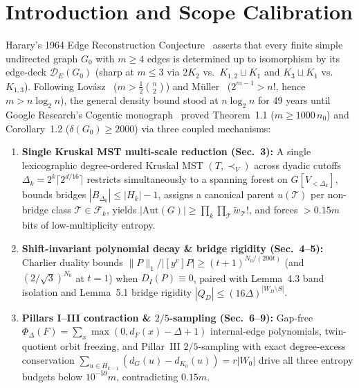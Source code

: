 \documentclass[10pt,twocolumn]{article}
\begin{document}
\section{Introduction and Scope Calibration}\label{sec:intro}
Harary's 1964 Edge Reconstruction Conjecture~\cite{harary1964problem} asserts that every finite simple undirected graph $G_0$ with $m \ge 4$ edges is determined up to isomorphism by its edge-deck $\mathcal{D}_E(G_0)$ (sharp at $m\le 3$ via $2K_2$ vs.\ $K_{1,2}\sqcup K_1$ and $K_3\sqcup K_1$ vs.\ $K_{1,3}$). Following Lov\'asz~\cite{lovasz1972note} ($m > \frac{1}{2}\binom{n}{2}$) and M\"uller~\cite{muller1977probabilistic} ($2^{m-1} > n!$, hence $m > n\log_2 n$), the general density bound stood at $n\log_2 n$ for 49 years until Google Research's Cogentic monograph~\cite{cogentic2026edgerecon} proved Theorem~1.1 ($m \ge 1000\,n_0$) and Corollary~1.2 ($\delta(G_0)\ge 2000$) via three coupled mechanisms:
\begin{enumerate}[leftmargin=1.2em,itemsep=1pt,topsep=2pt]
  \item \textbf{Single Kruskal MST multi-scale reduction (Sec.~3):} A single lexicographic degree-ordered Kruskal MST $(T,\prec_V)$ across dyadic cutoffs $\Delta_k = 2^k\lceil 2^{\bar{d}/16}\rceil$ restricts simultaneously to a spanning forest on $G[V_{<\Delta_k}]$, bounds bridges $|B_{\Delta_k}|\le |H_k|-1$, assigns a canonical parent $u(\mathcal{T})$ per non-bridge class $\mathcal{T}\in\mathcal{F}_k$, yields $|\mathrm{Aut}(G)|\ge \prod_k\prod_{\mathcal{T}}\tilde{w}_{\mathcal{T}}!$, and forces $>0.15m$ bits of low-multiplicity entropy.
  \item \textbf{Shift-invariant polynomial decay \& bridge rigidity (Sec.~4--5):} Charlier duality bounds $\|P\|_1/|[y^v]P| \ge (t+1)^{N_0/(200t)}$ (and $(2/\sqrt{3})^{N_0}$ at $t{=}1$) when $D_I(P)\equiv 0$, paired with Lemma~4.3 band isolation and Lemma~5.1 bridge rigidity $|Q_D|\le (16\Delta)^{|W_D\setminus S|}$.
  \item \textbf{Pillars I--III contraction \& $2/5$-sampling (Sec.~6--9):} Gap-free $\Phi_\Delta(F) = \sum_x\max(0,d_F(x)-\Delta+1)$ internal-edge polynomials, twin-quotient orbit freezing, and Pillar~III $2/5$-sampling with exact degree-excess conservation $\sum_{u\in H_{k-1}}(d_G(u)-d_{K_0}(u)) = r|W_0|$ drive all three entropy budgets below $10^{-59}m$, contradicting $0.15m$.
\end{enumerate}
\end{document}
